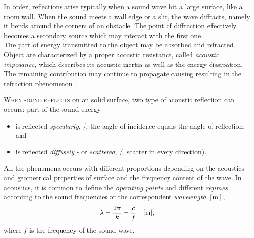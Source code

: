In order, reflections arise typically when a sound wave hit a large surface, like a room wall.
When the sound meets a wall edge or a slit, the wave diffracts, namely it bends around the corners of an obstacle.
The point of diffraction effectively becomes a secondary source which may interact with the first one.
\\The part of energy transmitted to the object may be absorbed and refracted.
Object are characterized by a proper acoustic resistance, called \textit{acoustic impedance}, which
describes its acoustic inertia as well as the energy dissipation.
The remaining contribution may continue to propagate causing resulting in the refraction phenomenon .

\textsc{When sound reflects} on an solid surface, two type of acoustic reflection can occurs: part of the sound energy
\begin{itemize}
    \item is reflected \textit{specularly}, \ie/, the angle of incidence equals the angle of reflection; and
    \item is reflected \textit{diffusely} - or \textit{scattered}, \ie/, scatter in every direction).
\end{itemize}

All the phenomena occurs with different proportions depending on the acoustics and geometrical properties of surface and the frequency content of the wave.
In acoustics, it is common to define the \textit{operating points} and different \textit{regimes}
according to the sound frequencies or the correspondent \textit{wavelength} $[\si{\metre}]$,
\begin{equation}
    \lambda = \frac{2 \pi}{k} = \frac{c}{f} \hspace{1em} [\si{\metre}]
    ,
\end{equation}
where $f$ is the frequency of the sound wave.

